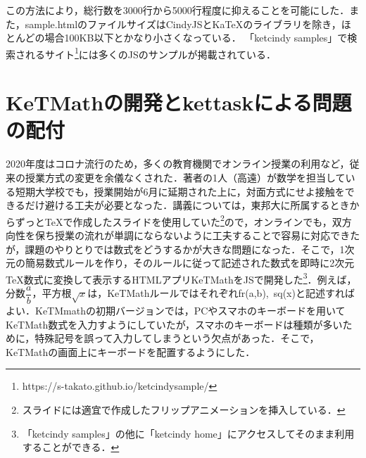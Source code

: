 \documentclass[a4j,12pt]{ujarticle}
\begin{document}
この方法により，総行数を3000行から5000行程度に抑えることを可能にした．また，sample.htmlのファイルサイズはCindyJSとKaTeXのライブラリを除き，ほとんどの場合100KB以下とかなり小さくなっている．
「ketcindy samples」で検索されるサイト\footnote{https://s-takato.github.io/ketcindysample/}には多くの\ketcindy JSのサンプルが掲載されている．

\section{KeTMathの開発とkettaskによる問題の配付}

2020年度はコロナ流行のため，多くの教育機関でオンライン授業の利用など，従来の授業方式の変更を余儀なくされた．著者の1人（高遠）が数学を担当している短期大学校でも，授業開始が6月に延期された上に，対面方式にせよ接触をできるだけ避ける工夫が必要となった．講義については，東邦大に所属するときからずっと\TeX で作成したスライドを使用していた\footnote{スライドには適宜\ketcindy で作成したフリップアニメーションを挿入している．}ので，オンラインでも，双方向性を保ち授業の流れが単調にならないように工夫することで容易に対応できたが，課題のやりとりでは数式をどうするかが大きな問題になった．そこで，1次元の簡易数式ルールを作り，そのルールに従って記述された数式を即時に2次元\TeX 数式に変換して表示するHTMLアプリKeTMathを\ketcindy JSで開発した\footnote{「ketcindy samples」の他に「ketcindy home」にアクセスしてそのまま利用することができる．}．例えば，
分数$\dfrac{a}{b}$，平方根$\sqrt{x}$は，KeTMathルールではそれぞれfr(a,b),\ sq(x)と記述すればよい．KeTMmathの初期バージョンでは，PCやスマホのキーボードを用いてKeTMath数式を入力すようにしていたが，スマホのキーボードは種類が多いために，特殊記号を誤って入力してしまうという欠点があった．そこで，KeTMathの画面上にキーボードを配置するようにした．
\end{document}
